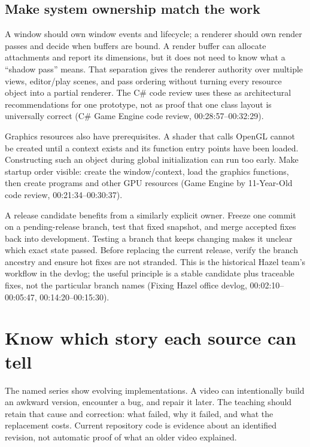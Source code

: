 \subsection{Make system ownership match the work}\label{05-engine-i-ch008-make-system-ownership-match-the-work}

A window should own window events and lifecycle; a renderer should own render passes and decide when buffers are bound. A render buffer can allocate attachments and report its dimensions, but it does not need to know what a ``shadow pass'' means. That separation gives the renderer authority over multiple views, editor/play scenes, and pass ordering without turning every resource object into a partial renderer. The C\# code review uses these as architectural recommendations for one prototype, not as proof that one class layout is universally correct (C\# Game Engine code review, 00:28:57--00:32:29).

Graphics resources also have prerequisites. A shader that calls OpenGL cannot be created until a context exists and its function entry points have been loaded. Constructing such an object during global initialization can run too early. Make startup order visible: create the window/context, load the graphics functions, then create programs and other GPU resources (Game Engine by 11-Year-Old code review, 00:21:34--00:30:37).

A release candidate benefits from a similarly explicit owner. Freeze one commit on a pending-release branch, test that fixed snapshot, and merge accepted fixes back into development. Testing a branch that keeps changing makes it unclear which exact state passed. Before replacing the current release, verify the branch ancestry and ensure hot fixes are not stranded. This is the historical Hazel team's workflow in the devlog; the useful principle is a stable candidate plus traceable fixes, not the particular branch names (Fixing Hazel office devlog, 00:02:10--00:05:47, 00:14:20--00:15:30).

\section{Know which story each source can tell}\label{05-engine-i-ch008-know-which-story-each-source-can-tell}

The named series show evolving implementations. A video can intentionally build an awkward version, encounter a bug, and repair it later. The teaching should retain that cause and correction: what failed, why it failed, and what the replacement costs. Current repository code is evidence about an identified revision, not automatic proof of what an older video explained.

